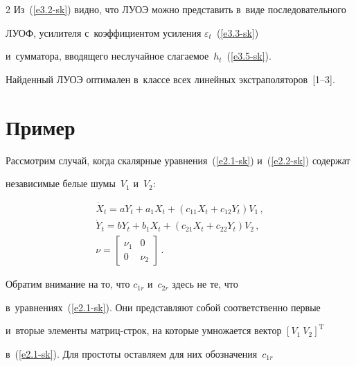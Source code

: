 \begin{multicols}{2}
Из~(\ref{e3.2-sk}) видно, что ЛУОЭ можно представить в~виде последовательного

ЛУОФ, усилителя с~коэффициентом усиления  $\varepsilon_t$~(\ref{e3.3-sk})

и~сумматора, вводящего неслучайное слагаемое~$h_t$~(\ref{e3.5-sk}).

Найденный ЛУОЭ оптимален в~классе всех линейных экстраполяторов~[1--3].



\vspace*{-6pt}



\section{Пример}



\vspace*{-2pt}



Рассмотрим случай, когда  скалярные уравнения~(\ref{e2.1-sk}) и~(\ref{e2.2-sk}) содержат

независимые белые шумы~$V_1$ и~$V_2$:



\noindent

\begin{gather*}

    \dot X_t = a Y_t + a_{1} X_t +( c_{11}X_t+ c_{12}Y_t ) V_1\,,\\

    \dot Y_t = b Y_t + b_{1} X_t +( c_{21}X_t+ c_{22}Y_t ) V_2\,,\\

\nu =\begin{bmatrix}

\nu_{1}&0\\

0&\nu_{2}\end{bmatrix}\,. %

\end{gather*}

Обратим внимание на то, что  $c_{1r}$ и~$c_{2r}$ здесь не те, что

в~уравнениях~(\ref{e2.1-sk}). Они представляют собой соответственно первые

и~вторые элементы мат\-риц-строк, на которые умножается вектор $\left[V_1\ V_2\right]^{\mathrm{T}}$

в~(\ref{e2.1-sk}). Для простоты оставляем для них обозначения~$c_{1r}$


\end{multicols}

